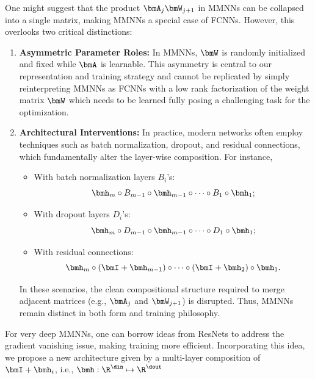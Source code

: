 \documentclass[review,hidelinks,onefignum,onetabnum]{siamart250211}
\begin{document}

One might suggest that the product \(\bmA_j \bmW_{j+1}\) in MMNNs can be collapsed into a single matrix, making MMNNs a special case of FCNNs. However, this overlooks two critical distinctions:

\begin{enumerate}
    \item \textbf{Asymmetric Parameter Roles:} In MMNNs, \(\bmW\) is randomly initialized and fixed while \(\bmA\) is learnable. This asymmetry is central to our representation and training strategy and cannot be replicated by simply reinterpreting MMNNs as FCNNs with a low rank factorization of the weight matrix $\bmW$ which needs to be learned fully posing a challenging task for the optimization.
    
    \item \textbf{Architectural Interventions:} In practice, modern networks often employ techniques such as batch normalization, dropout, and residual connections, which fundamentally alter the layer-wise composition. For instance,
    \begin{itemize}
        \item With batch normalization layers $B_i$'s:
        \[
        \bmh_m \circ B_{m-1} \circ \bmh_{m-1} \circ \cdots \circ B_1 \circ \bmh_1;
        \]
        \item With dropout layers $D_i$'s:
        \[
        \bmh_m \circ D_{m-1} \circ \bmh_{m-1} \circ \cdots \circ D_1 \circ \bmh_1;
        \]
        \item With residual connections:
        \[
        \bmh_m \circ (\bmI + \bmh_{m-1}) \circ \cdots \circ (\bmI + \bmh_2)\circ   \bmh_1.
        \]
    \end{itemize}
    In these scenarios, the clean compositional structure required to merge adjacent matrices (e.g., \(\bmA_j\) and \(\bmW_{j+1}\)) is disrupted. Thus, MMNNs remain distinct in both form and training philosophy.
\end{enumerate}
For very deep MMNNs, one can borrow ideas from ResNets \cite{7780459} to address the gradient vanishing issue, making training more efficient. Incorporating this idea, we propose a new architecture given by a multi-layer composition of $\bmI+\bmh_i$, i.e., $\bmh:\R^\din \mapsto \R^\dout$
\end{document}
